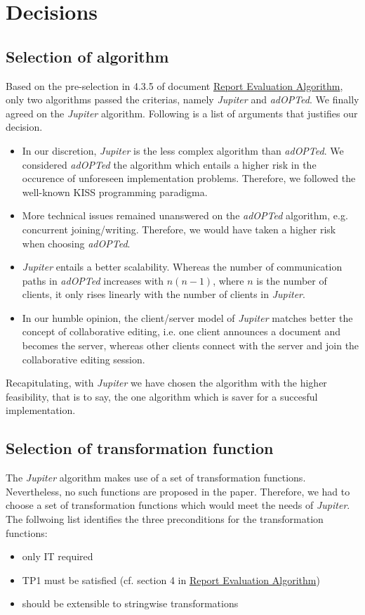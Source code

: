 \chapter{Decisions}
\section{Selection of algorithm}
Based on the pre-selection in 4.3.5 of document \href{http://ace.iserver.ch:81/repos/ace/ace/trunk/doc/pdf/algorithm.pdf}{Report Evaluation Algorithm}, only two algorithms passed the criterias, namely \emph{Jupiter} and \emph{adOPTed}. We finally agreed on the \emph{Jupiter} algorithm. Following is a list of arguments that justifies our decision.

\begin{itemize}
 \item In our discretion, \emph{Jupiter} is the less complex algorithm than \emph{adOPTed}. We considered \emph{adOPTed} the algorithm which entails a higher risk in the occurence of unforeseen implementation problems. Therefore, we followed the well-known KISS programming paradigma.
 \item More technical issues remained unanswered on the \emph{adOPTed} algorithm, e.g. concurrent joining/writing. Therefore, we would have taken a higher risk when choosing \emph{adOPTed}.
 \item \emph{Jupiter} entails a better scalability. Whereas the number of communication paths in \emph{adOPTed} increases with $n(n-1)$, where $n$ is the number of clients, it only rises linearly with the number of clients in \emph{Jupiter}.
 \item In our humble opinion, the client/server model of \emph{Jupiter} matches better the concept of collaborative editing, i.e. one client announces a document and becomes the server, whereas other clients connect with the server and join the collaborative editing session.
\end{itemize}

Recapitulating, with \emph{Jupiter} we have chosen the algorithm with the higher feasibility, that is to say, the one algorithm which is saver for a succesful implementation.

\section{Selection of transformation function}
The \emph{Jupiter} algorithm makes use of a set of transformation functions. Nevertheless, no such functions are proposed in the paper. Therefore, we had to choose a set of transformation functions which would meet the needs of \emph{Jupiter}. The follwoing list identifies the three preconditions for the transformation functions:
\begin{itemize}
 \item only IT required
 \item TP1 must be satisfied (cf. section 4 in \href{http://ace.iserver.ch:81/repos/ace/ace/trunk/doc/pdf/algorithm.pdf}{Report Evaluation Algorithm})
 \item should be extensible to stringwise transformations
\end{itemize}

